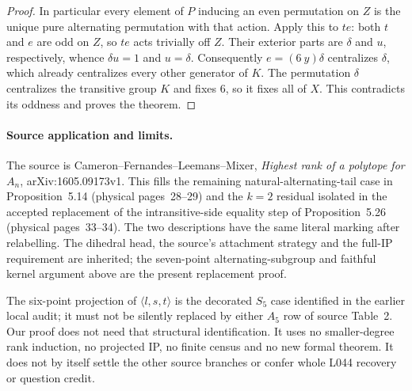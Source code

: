 \documentclass[11pt,a4paper]{article}
\newcommand{\gen}[1]{\langle#1\rangle}
\begin{document}
\begin{proof}
In particular every element of $P$ inducing an even
permutation on $Z$ is the unique pure alternating permutation
with that action. Apply this to $te$: both $t$ and $e$ are odd
on $Z$, so $te$ acts trivially off $Z$. Their exterior parts
are $\delta$ and $u$, respectively, whence $\delta u=1$ and
$u=\delta$. Consequently $e=(6\ y)\delta$ centralizes
$\delta$, which already centralizes every other generator
of $K$. The permutation $\delta$ centralizes the transitive
group $K$ and fixes $6$, so it fixes all of $X$.
This contradicts its oddness and proves the theorem.
\end{proof}

\paragraph{Source application and limits.}
The source is Cameron--Fernandes--Leemans--Mixer,
\emph{Highest rank of a polytope for $A_n$},
arXiv:1605.09173v1. This fills the remaining natural-alternating-tail
case in Proposition~5.14 (physical pages~28--29) and the
$k=2$ residual isolated in the accepted replacement of the
intransitive-side equality step of Proposition~5.26
(physical pages~33--34). The two descriptions have the same
literal marking after relabelling. The dihedral head, the
source's attachment strategy and the full-IP requirement are
inherited; the seven-point alternating-subgroup and faithful
kernel argument above are the present replacement proof.

The six-point projection of $\gen{l,s,t}$ is the decorated
$S_5$ case identified in the earlier local audit; it must not
be silently replaced by either $A_5$ row of source Table~2.
Our proof does not need that structural identification.
It uses no smaller-degree rank induction, no projected IP,
no finite census and no new formal theorem. It does not
by itself settle the other source branches or confer whole
L044 recovery or question credit.
\end{document}
